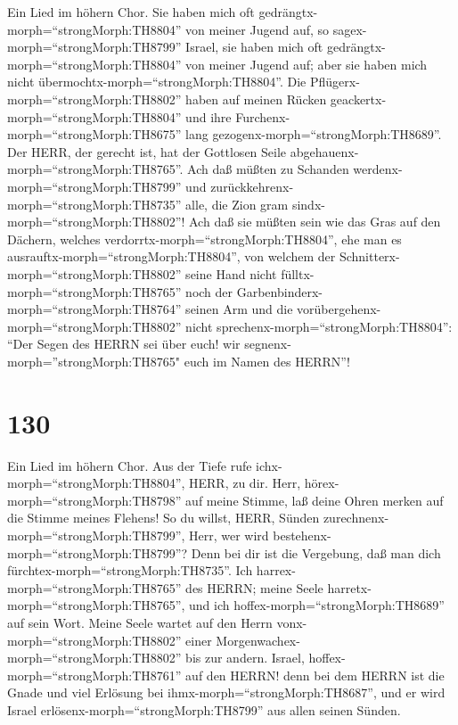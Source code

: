  Ein Lied im höhern Chor. Sie haben mich oft
gedrängtx-morph=``strongMorph:TH8804'' von meiner Jugend auf, so
sagex-morph=``strongMorph:TH8799'' Israel,  sie haben mich
oft gedrängtx-morph=``strongMorph:TH8804'' von meiner Jugend auf; aber
sie haben mich nicht übermochtx-morph=``strongMorph:TH8804''.
 Die Pflügerx-morph=``strongMorph:TH8802'' haben auf meinen
Rücken geackertx-morph=``strongMorph:TH8804'' und ihre
Furchenx-morph=``strongMorph:TH8675'' lang
gezogenx-morph=``strongMorph:TH8689''.  Der HERR, der
gerecht ist, hat der Gottlosen Seile
abgehauenx-morph=``strongMorph:TH8765''.  Ach daß müßten zu
Schanden werdenx-morph=``strongMorph:TH8799'' und
zurückkehrenx-morph=``strongMorph:TH8735'' alle, die Zion gram
sindx-morph=``strongMorph:TH8802''!  Ach daß sie müßten sein
wie das Gras auf den Dächern, welches
verdorrtx-morph=``strongMorph:TH8804'', ehe man es
ausrauftx-morph=``strongMorph:TH8804'',  von welchem der
Schnitterx-morph=``strongMorph:TH8802'' seine Hand nicht
fülltx-morph=``strongMorph:TH8765'' noch der
Garbenbinderx-morph=``strongMorph:TH8764'' seinen Arm  und
die vorübergehenx-morph=``strongMorph:TH8802'' nicht
sprechenx-morph=``strongMorph:TH8804'': ``Der Segen des HERRN sei über
euch! wir segnenx-morph=''strongMorph:TH8765" euch im Namen des HERRN''!

\hypertarget{section-129}{%
\section{130}\label{section-129}}

 Ein Lied im höhern Chor. Aus der Tiefe rufe
ichx-morph=``strongMorph:TH8804'', HERR, zu dir.  Herr,
hörex-morph=``strongMorph:TH8798'' auf meine Stimme, laß deine Ohren
merken auf die Stimme meines Flehens!  So du willst, HERR,
Sünden zurechnenx-morph=``strongMorph:TH8799'', Herr, wer wird
bestehenx-morph=``strongMorph:TH8799''?  Denn bei dir ist
die Vergebung, daß man dich fürchtex-morph=``strongMorph:TH8735''.
 Ich harrex-morph=``strongMorph:TH8765'' des HERRN; meine
Seele harretx-morph=``strongMorph:TH8765'', und ich
hoffex-morph=``strongMorph:TH8689'' auf sein Wort.  Meine
Seele wartet auf den Herrn vonx-morph=``strongMorph:TH8802'' einer
Morgenwachex-morph=``strongMorph:TH8802'' bis zur andern. 
Israel, hoffex-morph=``strongMorph:TH8761'' auf den HERRN! denn bei dem
HERRN ist die Gnade und viel Erlösung bei
ihmx-morph=``strongMorph:TH8687'',  und er wird Israel
erlösenx-morph=``strongMorph:TH8799'' aus allen seinen Sünden.

